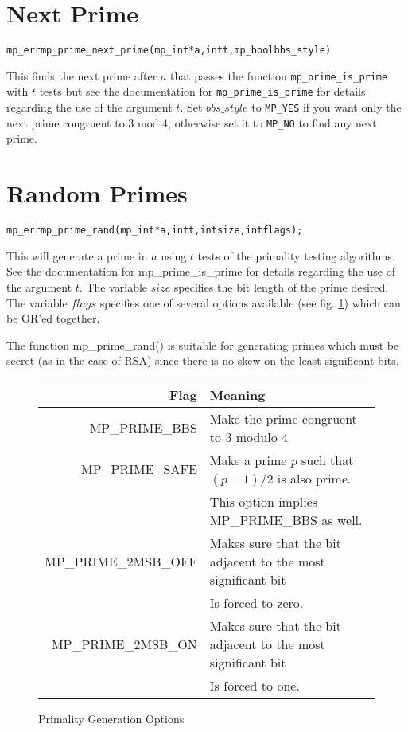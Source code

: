 \documentclass[synpaper]{book}
\begin{document}
\section{Next Prime}
\begin{alltt}
mp_err mp_prime_next_prime(mp_int *a, int t, mp_bool bbs_style)
\end{alltt}
This finds the next prime after $a$ that passes the function \texttt{mp\_prime\_is\_prime} with $t$ tests but see the documentation for
\texttt{mp\_prime\_is\_prime} for details regarding the use of the argument $t$.  Set $bbs\_style$ to \texttt{MP\_YES} if you
want only the next prime congruent to $3 \mbox{ mod } 4$, otherwise set it to \texttt{MP\_NO} to find any next prime.

\section{Random Primes}
\begin{alltt}
mp_err mp_prime_rand(mp_int *a, int t, int size, int flags);
\end{alltt}
This will generate a prime in $a$ using $t$ tests of the primality testing algorithms.
See the documentation for mp\_prime\_is\_prime for details regarding the use of the argument $t$.
The variable $size$ specifies the bit length of the prime desired.
The variable $flags$ specifies one of several options available
(see fig. \ref{fig:primeopts}) which can be OR'ed together.

The function mp\_prime\_rand() is suitable for generating primes which must be secret (as in the case of RSA) since there
is no skew on the least significant bits.

\begin{figure}[h]
\begin{center}
\begin{small}
\begin{tabular}{|r|l|}
\hline \textbf{Flag}         & \textbf{Meaning} \\
\hline MP\_PRIME\_BBS       & Make the prime congruent to $3$ modulo $4$ \\
\hline MP\_PRIME\_SAFE      & Make a prime $p$ such that $(p - 1)/2$ is also prime. \\
                             & This option implies MP\_PRIME\_BBS as well. \\
\hline MP\_PRIME\_2MSB\_OFF & Makes sure that the bit adjacent to the most significant bit \\
                             & Is forced to zero.  \\
\hline MP\_PRIME\_2MSB\_ON  & Makes sure that the bit adjacent to the most significant bit \\
                             & Is forced to one. \\
\hline
\end{tabular}
\end{small}
\end{center}
\caption{Primality Generation Options}
\label{fig:primeopts}
\end{figure}
\end{document}
